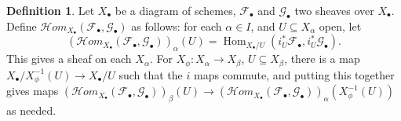 \documentclass{amsart}
\theoremstyle{definition}
\newtheorem{definition}[theorem]{Definition}
\DeclareMathOperator{\Hom}{Hom}
\newcommand{\cHom}{\mathcal{H} \textit{om}}
\newcommand{\FF}{\mathscr{F}}
\newcommand{\GG}{\mathscr{G}}
\begin{document}
\begin{definition}
	Let $X_\bullet$ be a diagram of schemes, $\FF_\bullet$ and $\GG_\bullet$ two sheaves over $X_\bullet$.
	Define $\cHom_{X_\bullet}(\FF_\bullet, \GG_\bullet)$ as follows: for each $\alpha \in I$, and $U \subseteq X_\alpha$ open, let
	\[
		(\cHom_{X_\bullet}(\FF_\bullet, \GG_\bullet))_\alpha(U) = \Hom_{X_\bullet/U} ( i_U^* \FF_\bullet , i_U^* \GG_\bullet).
	\]
	This gives a sheaf on each $X_\alpha$.
	For $X_\phi : X_\alpha \rightarrow X_\beta$, $U \subseteq X_\beta$, there is a map $X_\bullet / X_\phi^{-1}(U) \rightarrow X_\bullet / U$ such that the $i$ maps commute, and putting this together gives maps $(\cHom_{X_\bullet}(\FF_\bullet, \GG_\bullet))_\beta(U) \rightarrow (\cHom_{X_\bullet}(\FF_\bullet, \GG_\bullet))_\alpha(X_\phi^{-1}(U))$ as needed.
\end{definition}
\end{document}
